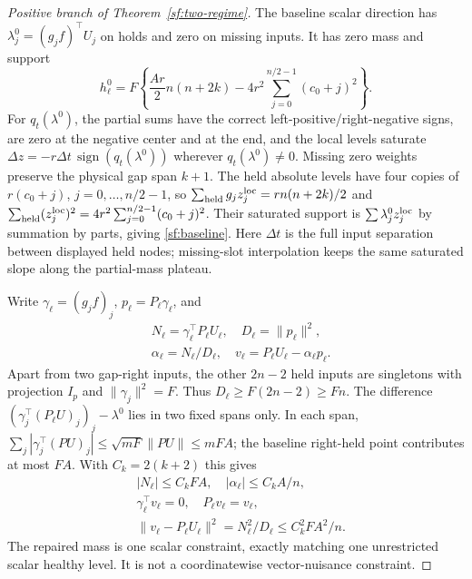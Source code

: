 \documentclass[journal]{IEEEtran}
\begin{document}
\begin{proof}[Positive branch of Theorem~\ref{sf:two-regime}]
The baseline scalar direction has $\lambda_j^0=(g_jf)^\top U_j$ on holds
and zero on missing inputs. It has zero mass and support
\begin{equation}\label{sf:baseline}
h_\ell^0=F\left\{\frac{Ar}{2}n(n+2k)
-4r^2\sum_{j=0}^{n/2-1}(c_0+j)^2\right\}.
\end{equation}
For $q_t(\lambda^0)$, the partial sums have the correct left-positive/right-negative signs,
are zero at the negative center and at the end, and the local levels
saturate $\Delta z=-r\Delta t\,\operatorname{sign}(q_t(\lambda^0))$ wherever $q_t(\lambda^0)\ne0$.
Missing zero weights preserve the physical gap span $k+1$.
The held absolute levels have four copies of
$r(c_0+j)$, $j=0,\ldots,n/2-1$, so
$\sum_{\rm held}g_jz_j^{\rm loc}=rn(n+2k)/2$ and
$\sum_{\rm held}(z_j^{\rm loc})^2=4r^2\sum_{j=0}^{n/2-1}(c_0+j)^2$.
Their saturated support is $\sum\lambda_j^0z_j^{\rm loc}$ by summation
by parts, giving \eqref{sf:baseline}. Here $\Delta t$ is the full input
separation between displayed held nodes; missing-slot interpolation keeps
the same saturated slope along the partial-mass plateau.

Write $\gamma_\ell=(g_jf)_j$, $p_\ell=P_\ell \gamma_\ell$, and
\[
\begin{aligned}
&N_\ell=\gamma_\ell^\top P_\ell U_\ell,\quad D_\ell=\|p_\ell\|^2,\\
&\alpha_\ell=N_\ell/D_\ell,\quad v_\ell=P_\ell U_\ell-\alpha_\ell p_\ell .
\end{aligned}
\]
Apart from two gap-right inputs, the other $2n-2$ held inputs are singletons
with projection $I_p$ and $\|\gamma_j\|^2=F$.
Thus $D_\ell\ge F(2n-2)\ge Fn$.
The difference $(\gamma_j^\top(P_\ell U)_j)_j-\lambda^0$ lies in two fixed
spans only. In each span,
$\sum_j|\gamma_j^\top(PU)_j|\le\sqrt{mF}\|PU\|\le mFA$;
the baseline right-held point contributes at most $FA$.
With $C_k=2(k+2)$ this gives
\[
\begin{aligned}
&|N_\ell|\le C_kFA,\quad |\alpha_\ell|\le C_kA/n,\\
&\gamma_\ell^\top v_\ell=0,\quad P_\ell v_\ell=v_\ell,\\
&\|v_\ell-P_\ell U_\ell\|^2=N_\ell^2/D_\ell\le C_k^2FA^2/n .
\end{aligned}
\]
The repaired mass is one scalar constraint, exactly matching one unrestricted
scalar healthy level. It is not a coordinatewise vector-nuisance constraint.


\end{proof}
\end{document}
